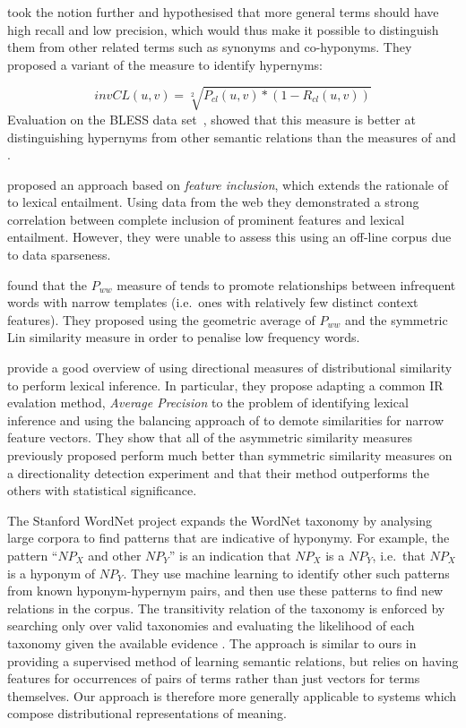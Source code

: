 \documentclass[11pt]{article}
\begin{document}
 took the notion further and hypothesised that more general terms should have high recall and low precision, which would thus make it possible to distinguish them from other related terms such as synonyms and co-hyponyms.  They proposed a variant of the  measure to identify hypernyms:

\[
invCL(u,v) = \sqrt[2]{P_{cl}(u,v)*(1-R_{cl}(u,v))}
\]
Evaluation on the BLESS data set~\cite{Baroni2011}, showed that this measure is  better at distinguishing hypernyms from other semantic relations than the measures of  and .

 proposed an approach based on \emph{feature inclusion}, which extends the rationale of~ to lexical entailment. Using data from the web they demonstrated a strong correlation between complete inclusion of prominent features and lexical entailment. However, they were unable to assess this using an off-line corpus due to data sparseness.

 found that the $P_{ww}$ measure of  tends to promote relationships between infrequent words with narrow templates (i.e.~ones with relatively few distinct context features).  They proposed using the geometric average of $P_{ww}$ and the symmetric Lin similarity measure in order to penalise low frequency words.   

 provide a good overview of using directional measures of distributional similarity to perform lexical inference.  In particular, they propose adapting a common IR evalation method, \emph{Average Precision} to the problem of identifying lexical inference and using the balancing approach of  to demote similarities for narrow feature vectors.  They show that all of the asymmetric similarity measures previously proposed perform much better than symmetric similarity measures on a directionality detection experiment and that their method outperforms the others with statistical significance.

The Stanford WordNet project \cite{Snow:04} expands the WordNet
taxonomy by analysing large corpora to find patterns that are
indicative of hyponymy. For example, the pattern ``$\mathit{NP}_X$ and
other $\mathit{NP}_Y$'' is an indication that $\mathit{NP}_X$ is a
$\mathit{NP}_Y$, i.e.~that $\mathit{NP}_X$ is a hyponym of
$\mathit{NP}_Y$. They use machine learning to identify other such
patterns from known hyponym-hypernym pairs, and then use these
patterns to find new relations in the corpus. The
transitivity relation of the taxonomy is enforced by searching only over valid
taxonomies and evaluating the likelihood of each taxonomy given the
available evidence \cite{Snow:06}. The approach is similar to
ours in providing a supervised method of learning semantic relations, but relies on having features for occurrences of pairs of terms rather than just vectors for terms themselves. Our approach is therefore more generally applicable to systems which compose distributional
representations of meaning.
\end{document}

